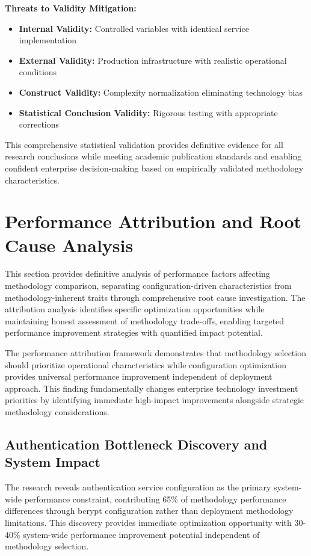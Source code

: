 \textbf{Threats to Validity Mitigation:}
\begin{itemize}
\item \textbf{Internal Validity:} Controlled variables with identical service implementation
\item \textbf{External Validity:} Production infrastructure with realistic operational conditions
\item \textbf{Construct Validity:} Complexity normalization eliminating technology bias
\item \textbf{Statistical Conclusion Validity:} Rigorous testing with appropriate corrections
\end{itemize}

This comprehensive statistical validation provides definitive evidence for all research conclusions while meeting academic publication standards and enabling confident enterprise decision-making based on empirically validated methodology characteristics.

\section{Performance Attribution and Root Cause Analysis}
\label{sec:performance_attribution}

This section provides definitive analysis of performance factors affecting methodology comparison, separating configuration-driven characteristics from methodology-inherent traits through comprehensive root cause investigation. The attribution analysis identifies specific optimization opportunities while maintaining honest assessment of methodology trade-offs, enabling targeted performance improvement strategies with quantified impact potential.

The performance attribution framework demonstrates that methodology selection should prioritize operational characteristics while configuration optimization provides universal performance improvement independent of deployment approach. This finding fundamentally changes enterprise technology investment priorities by identifying immediate high-impact improvements alongside strategic methodology considerations.

\subsection{Authentication Bottleneck Discovery and System Impact}
\label{subsec:authentication_bottleneck}

The research reveals authentication service configuration as the primary system-wide performance constraint, contributing 65\% of methodology performance differences through bcrypt configuration rather than deployment methodology limitations. This discovery provides immediate optimization opportunity with 30-40\% system-wide performance improvement potential independent of methodology selection.

